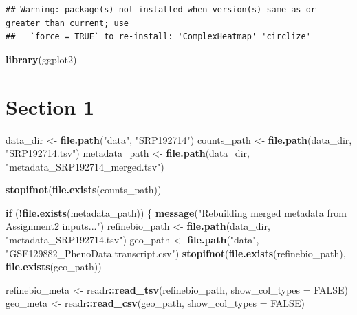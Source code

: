 \documentclass[
]{article}
\newenvironment{Shaded}{\begin{snugshade}}{\end{snugshade}}
\newcommand{\AttributeTok}[1]{\textcolor[rgb]{0.13,0.29,0.53}{#1}}
\newcommand{\ConstantTok}[1]{\textcolor[rgb]{0.56,0.35,0.01}{#1}}
\newcommand{\ControlFlowTok}[1]{\textcolor[rgb]{0.13,0.29,0.53}{\textbf{#1}}}
\newcommand{\FunctionTok}[1]{\textcolor[rgb]{0.13,0.29,0.53}{\textbf{#1}}}
\newcommand{\NormalTok}[1]{#1}
\newcommand{\OtherTok}[1]{\textcolor[rgb]{0.56,0.35,0.01}{#1}}
\newcommand{\SpecialCharTok}[1]{\textcolor[rgb]{0.81,0.36,0.00}{\textbf{#1}}}
\newcommand{\StringTok}[1]{\textcolor[rgb]{0.31,0.60,0.02}{#1}}
\begin{document}
\begin{verbatim}
## Warning: package(s) not installed when version(s) same as or greater than current; use
##   `force = TRUE` to re-install: 'ComplexHeatmap' 'circlize'
\end{verbatim}

\begin{Shaded}
\begin{Highlighting}[]
\FunctionTok{library}\NormalTok{(ggplot2)}
\end{Highlighting}
\end{Shaded}

\section{Section 1}\label{section-1}

\begin{Shaded}
\begin{Highlighting}[]
\NormalTok{data\_dir }\OtherTok{\textless{}{-}} \FunctionTok{file.path}\NormalTok{(}\StringTok{"data"}\NormalTok{, }\StringTok{"SRP192714"}\NormalTok{)}
\NormalTok{counts\_path }\OtherTok{\textless{}{-}} \FunctionTok{file.path}\NormalTok{(data\_dir, }\StringTok{"SRP192714.tsv"}\NormalTok{)}
\NormalTok{metadata\_path }\OtherTok{\textless{}{-}} \FunctionTok{file.path}\NormalTok{(data\_dir, }\StringTok{"metadata\_SRP192714\_merged.tsv"}\NormalTok{)}

\FunctionTok{stopifnot}\NormalTok{(}\FunctionTok{file.exists}\NormalTok{(counts\_path))}

\ControlFlowTok{if}\NormalTok{ (}\SpecialCharTok{!}\FunctionTok{file.exists}\NormalTok{(metadata\_path)) \{}
    \FunctionTok{message}\NormalTok{(}\StringTok{"Rebuilding merged metadata from Assignment2 inputs..."}\NormalTok{)}
\NormalTok{    refinebio\_path }\OtherTok{\textless{}{-}} \FunctionTok{file.path}\NormalTok{(data\_dir, }\StringTok{"metadata\_SRP192714.tsv"}\NormalTok{)}
\NormalTok{    geo\_path }\OtherTok{\textless{}{-}} \FunctionTok{file.path}\NormalTok{(}\StringTok{"data"}\NormalTok{, }\StringTok{"GSE129882\_PhenoData.transcript.csv"}\NormalTok{)}
    \FunctionTok{stopifnot}\NormalTok{(}\FunctionTok{file.exists}\NormalTok{(refinebio\_path), }\FunctionTok{file.exists}\NormalTok{(geo\_path))}

\NormalTok{    refinebio\_meta }\OtherTok{\textless{}{-}}\NormalTok{ readr}\SpecialCharTok{::}\FunctionTok{read\_tsv}\NormalTok{(refinebio\_path, }\AttributeTok{show\_col\_types =} \ConstantTok{FALSE}\NormalTok{)}
\NormalTok{    geo\_meta }\OtherTok{\textless{}{-}}\NormalTok{ readr}\SpecialCharTok{::}\FunctionTok{read\_csv}\NormalTok{(geo\_path, }\AttributeTok{show\_col\_types =} \ConstantTok{FALSE}\NormalTok{)}


\end{Highlighting}
\end{Shaded}
\end{document}
